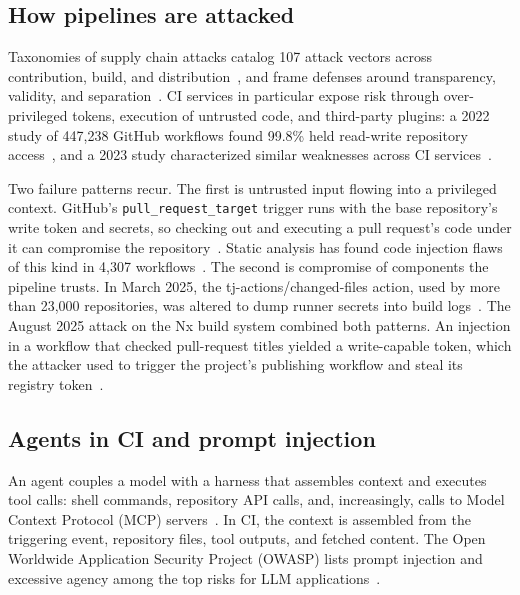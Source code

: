 \documentclass[acmsmall,screen,review]{acmart}
\providecommand{\code}[1]{\texttt{#1}}
\begin{document}
\subsection{How pipelines are attacked}\label{sec:2.2}

Taxonomies of supply chain attacks catalog 107 attack vectors across contribution, build, and distribution~\cite{ladisa2023sok}, and frame defenses around transparency, validity, and separation~\cite{okafor2022sok}. CI services in particular expose risk through over-privileged tokens, execution of untrusted code, and third-party plugins: a 2022 study of 447,238 GitHub workflows found 99.8\% held read-write repository access~\cite{koishybayev2022characterizing}, and a 2023 study characterized similar weaknesses across CI services~\cite{gu2023continuous}.

Two failure patterns recur. The first is untrusted input flowing into a privileged context. GitHub's \code{pull\_\allowbreak{}request\_\allowbreak{}target} trigger runs with the base repository's write token and secrets, so checking out and executing a pull request's code under it can compromise the repository~\cite{lobavcevski2021keeping}. Static analysis has found code injection flaws of this kind in 4,307 workflows~\cite{muralee2023argus}. The second is compromise of components the pipeline trusts. In March 2025, the tj-actions/changed-files action, used by more than 23,000 repositories, was altered to dump runner secrets into build logs~\cite{stepsecurity2025harden}. The August 2025 attack on the Nx build system combined both patterns. An injection in a workflow that checked pull-request titles yielded a write-capable token, which the attacker used to trigger the project's publishing workflow and steal its registry token~\cite{nx2025s1ngularity}.


\subsection{Agents in CI and prompt injection}\label{sec:2.3}

An agent couples a model with a harness that assembles context and executes tool calls: shell commands, repository API calls, and, increasingly, calls to Model Context Protocol (MCP) servers~\cite{model2025security}. In CI, the context is assembled from the triggering event, repository files, tool outputs, and fetched content. The Open Worldwide Application Security Project (OWASP) lists prompt injection and excessive agency among the top risks for LLM applications~\cite{owaspndowasp}.
\end{document}
